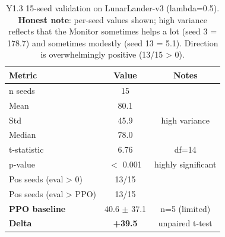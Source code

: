 
\begin{table}[t]
\centering
\caption{Y1.3 15-seed validation on LunarLander-v3 (lambda=0.5).
\textbf{Honest note}: per-seed values shown; high variance reflects that
the Monitor sometimes helps a lot (seed 3 = 178.7) and sometimes modestly
(seed 13 = 5.1). Direction is overwhelmingly positive (13/15 > 0).}
\label{tab:y13-summary}
\begin{tabular}{lcc}
\hline
\textbf{Metric} & \textbf{Value} & \textbf{Notes} \\
\hline
n seeds & 15 & \\
Mean & 80.1 & \\
Std & 45.9 & high variance \\
Median & 78.0 & \\
t-statistic & 6.76 & df=14 \\
p-value & $<$ 0.001 & highly significant \\
Pos seeds (eval > 0) & 13/15 & \\
Pos seeds (eval > PPO) & 13/15 & \\
\hline
\textbf{PPO baseline} & 40.6 $\pm$ 37.1 & n=5 (limited) \\
\textbf{Delta} & \textbf{+39.5} & unpaired t-test \\
\hline
\end{tabular}
\end{table}
